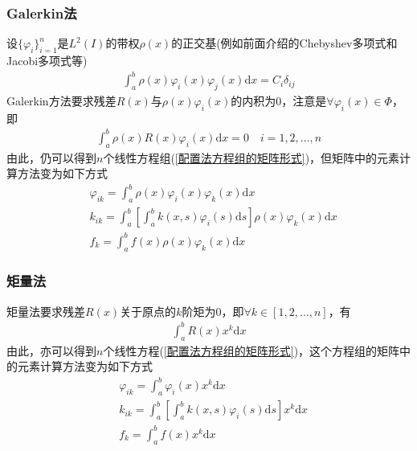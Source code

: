 		\subsubsection{Galerkin法}
			\label{subsubsec:Galerkin法}
			\par
			设$\{\varphi_i\}_{i = 1}^n$是$L^2(I)$的带权$\rho(x)$的正交基(例如前面介绍的Chebyshev多项式和Jacobi多项式等)
			\begin{align*}
				\int_a^b \rho(x) \varphi_i(x) \varphi_j(x) \mathrm{d}x = C_i \delta_{ij}
			\end{align*}
			Galerkin方法要求残差$R(x)$与$\rho(x)\varphi_i(x)$的内积为$0$，注意是$\forall \varphi_i(x) \in \varPhi$，即
			\begin{align*}
				\int_a^b \rho (x) R(x) \varphi_i(x)\mathrm{d}x = 0 \quad i = 1,2,\dots,n
			\end{align*}
			由此，仍可以得到$n$个线性方程组(\ref{配置法方程组的矩阵形式})，但矩阵中的元素计算方法变为如下方式
			\begin{align*}
				&\varphi_{ik} = \int_a^b\rho (x)\varphi_i(x) \varphi_k(x) \mathrm{d}x \\
				&k_{ik} = \int_a^b \left[\int_a^b k(x,s)\varphi_i(s)\mathrm{d}s\right] \rho (x) \varphi_k(x) \mathrm{d}x\\
				&f_k = \int_a^b f(x) \rho(x) \varphi_k(x)\mathrm{d}x
			\end{align*}

		\subsubsection{矩量法}
			\label{subsubsec:矩量法}
			\par
			矩量法要求残差$R(x)$关于原点的$k$阶矩为$0$，即$\forall k \in [1,2,\dots,n]$，有
			\begin{align*}
				\int_a^bR(x) x^k \mathrm{d}x
			\end{align*}
			由此，亦可以得到$n$个线性方程(\ref{配置法方程组的矩阵形式})，这个方程组的矩阵中的元素计算方法变为如下方式
			\begin{align*}
				&\varphi_{ik} = \int_a^b\varphi_i(x) x^k \mathrm{d}x \\
				&k_{ik} = \int_a^b \left[ \int_a^b k(x,s)\varphi_i(s)\mathrm{d}s \right] x^k \mathrm{d}x\\
				&f_k = \int_a^b f(x)x^k\mathrm{d}x
			\end{align*}

